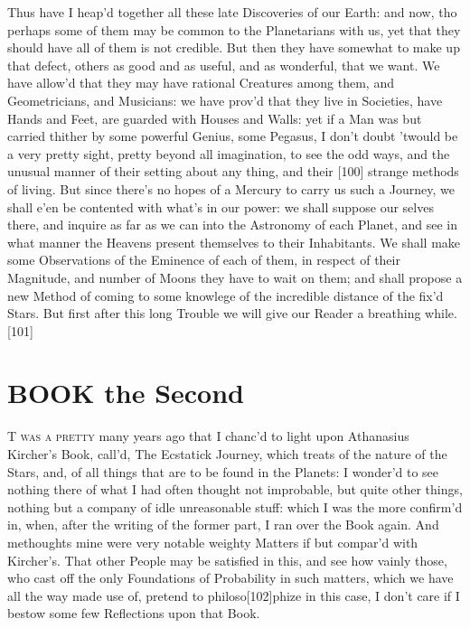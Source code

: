 \documentclass[letterpaper]{book}
\begin{document}
Thus have I heap'd together all these late Discoveries of our Earth: and
now, tho perhaps some of them may be common to the Planetarians with
us, yet that they should have all of them is not credible. But then they
have somewhat to make up that defect, others as good and as useful, and
as wonderful, that we want. We have allow'd that they may have rational
Creatures among them, and Geometricians, and Musicians: we have prov'd
that they live in Societies, have Hands and Feet, are guarded with Houses
and Walls: yet if a Man was but carried thither by some powerful Genius,
some Pegasus, I don't doubt 'twould be a very pretty sight, pretty beyond
all imagination, to see the odd ways, and the unusual manner of their setting
about any thing, and their [100] strange methods of living. But since there's
no hopes of a Mercury to carry us such a Journey, we shall e'en be contented
with what's in our power: we shall suppose our selves there, and inquire as
far as we can into the Astronomy of each Planet, and see in what manner
the Heavens present themselves to their Inhabitants. We shall make some
Observations of the Eminence of each of them, in respect of their Magnitude,
and number of Moons they have to wait on them; and shall propose a new
Method of coming to some knowlege of the incredible distance of the fix'd
Stars. But first after this long Trouble we will give our Reader a breathing
while.  [101]






\chapter{BOOK the Second}

\lettrine[lines=6, lraise=.26, ante={\fontsize{48}{48}\fontspec{EB
Garamond}'}]{ T}{
was a pretty } many years ago that I chanc'd to light upon Athanasius
Kircher's Book, call'd, The Ecstatick Journey, which treats of the nature of
the Stars, and, of all things that are to be found in the Planets: I wonder'd
to see nothing there of what I had often thought not improbable, but quite
other things, nothing but a company of idle unreasonable stuff: which I
was the more confirm'd in, when, after the writing of the former part, I
ran over the Book again. And methoughts mine were very notable weighty
Matters if but compar'd with Kircher's. That other People may be satisfied
in this, and see how vainly those, who cast off the only Foundations of
Probability in such matters, which we have all the way made use of, pretend
to philoso[102]phize in this case, I don't care if I bestow some few Reflections
upon that Book.  
\end{document}
